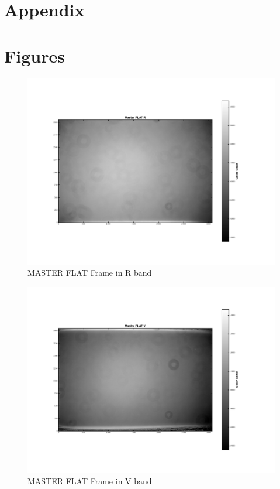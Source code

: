 \documentclass[12pt]{article}
\begin{document}
\printbibliography

\appendix
\section*{Appendix}
\section{Figures}\label{append}

    \begin{figure}[H]
    \centering
    \includegraphics[width=\textwidth]{fig/Master_FLAT_R.png}
    
    \caption{MASTER FLAT Frame in R band}
    \end{figure}

    \begin{figure}[H]
    \centering
    \includegraphics[width=\textwidth]{fig/Master_FLAT_V.png}
    
    \caption{MASTER FLAT Frame in V band}
    \end{figure}
\end{document}
